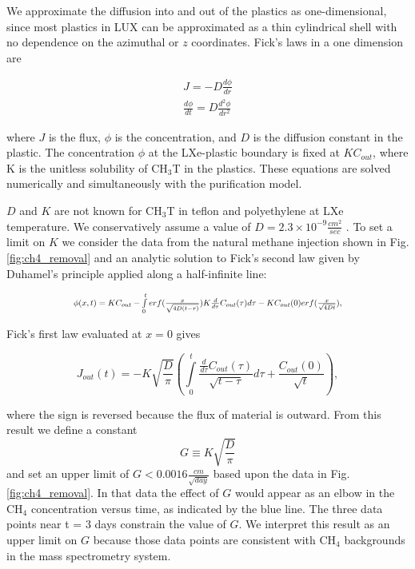 We approximate the diffusion into and out of the plastics as one-dimensional, since most plastics in LUX can be approximated as a thin cylindrical shell with no dependence on the azimuthal or $z$ coordinates.  Fick's laws in a one dimension are

\begin{align}
J=-D\frac{d \phi}{d r}  \\
\frac{d \phi}{d t} = D \frac{d^2 \phi}{d r^2} 
\end{align}

\noindent 
where $J$ is the flux, $\phi$ is the concentration, and $D$ is the diffusion constant in the plastic. The concentration $\phi$ at the LXe-plastic boundary is fixed at $KC_{out}$, where K is the unitless solubility of CH$_3$T in the plastics. These equations are solved numerically and simultaneously with the purification model. 

$D$ and $K$ are not known for CH$_3$T in teflon and polyethylene at LXe temperature. We conservatively assume a value of $D = 2.3 \times 10^{-9} \frac {cm^2}{sec}$ . To set a limit on $K$ we consider the data from the natural methane injection shown in Fig. \ref{fig:ch4_removal} and  an analytic solution to Fick's second law given by Duhamel's principle applied along a half-infinite line:

\begin{equation}
\Scale[0.75]{\phi (x,t) = KC_{out} - \int \limits_0^t erf(\frac{x}{\sqrt{4D(t - \tau)}})K\frac{d}{d\tau}C_{out}(\tau)d\tau - KC_{out}(0)erf(\frac{x}{\sqrt{4Dt}}),}
\end{equation}


\noindent
Fick's first law evaluated at $x=0$ gives

\begin{equation}
J_{out}(t)= - K \sqrt{\frac{D}{\pi}}\left( \int \limits_0^t \frac{\frac{d}{d\tau}C_{out}(\tau)}{\sqrt{t-\tau}} d \tau + \frac{C_{out}(0)}{\sqrt{t}}\right),
\end{equation}

\noindent
where the sign is reversed because the flux of material is outward. From this result we define a constant
\[ G \equiv K \sqrt{ \frac{D}{ \pi }} \] and set an upper limit of $G<0.0016 \frac{cm}{\sqrt{day}}$ based upon the data in Fig. \ref{fig:ch4_removal}. In that data the effect of $G$ would appear as an elbow in the CH$_4$ concentration versus time, as indicated by the blue line. The three data points near t = 3 days constrain the value of $G$. We interpret this result as an upper limit on $G$ because those data points are consistent with CH$_4$ backgrounds in the mass spectrometry system.

